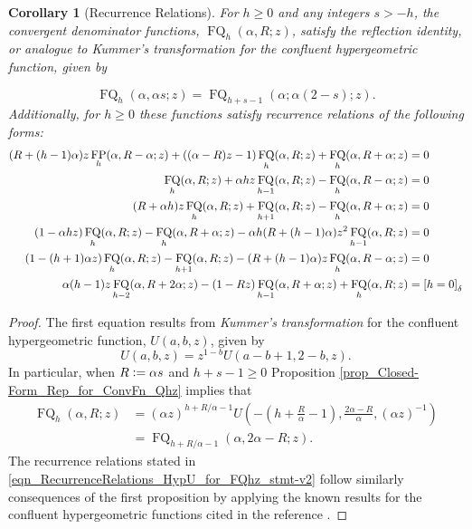 \documentclass[12pt,reqno]{article}
\renewenvironment{subequations}{%
  \refstepcounter{equation}%
  \edef\theparentequation{\theequation}%
  \setcounter{parentequation}{\value{equation}}%
  \setcounter{equation}{0}%
  \def\theequation{\theparentequation.\alph{equation}}%
  \ignorespaces
}{%
  \setcounter{equation}{\value{parentequation}}%
  \ignorespacesafterend
}
\numberwithin{sfootnote}{section}
\numberwithin{equation}{section}
\theoremstyle{DefaultTheoremStyle}
\newtheorem{cor}[theorem]{Corollary}
\theoremstyle{definition}
\newcommand{\defequals}{\ensuremath{\vcentcolon=}}
\newcommand{\StartGroupingSubEquations}{\begin{subequations}}
\newcommand{\EndGroupingSubEquations}{\end{subequations}}
\newcommand{\Iverson}[1]{\ensuremath{\left[#1\right]_{\delta}}}
\newcommand{\HypU}[3]{\ensuremath{U\left(#1, #2, #3\right)}}
\DeclareMathOperator{\FP}{FP}
\DeclareMathOperator{\FQ}{FQ}
\begin{document}
\begin{cor}[Recurrence Relations] 
\label{cor_HypU-Based_recurrences_for_FQhz} 
For $h \geq 0$ and any integers $s > -h$, the convergent denominator functions, 
$\FQ_h(\alpha, R; z)$, satisfy the reflection identity, or 
analogue to \emph{Kummer's transformation} for the 
confluent hypergeometric function, given by 
\StartGroupingSubEquations 
\begin{equation} 
\label{eqn_RecurrenceRelations_HypU_for_FQhz_stmt-v1} 
\FQ_h(\alpha, \alpha s; z) = \FQ_{h+s-1}(\alpha; \alpha (2-s); z). 
\end{equation} 
Additionally, for $h \geq 0$ these functions satisfy 
recurrence relations of the following forms: 
\begin{align} 
\label{eqn_RecurrenceRelations_HypU_for_FQhz_stmt-v2} 
(R+(h-1)\alpha) z \FP_h(\alpha, R-\alpha; z) + ((\alpha-R) z-1) 
     \FQ_h(\alpha, R; z) + \FQ_h(\alpha, R+\alpha; z) & = 0 \\ 
\notag 
\FQ_h(\alpha, R; z) + \alpha h z \FQ_{h-1}(\alpha, R; z) - 
     \FQ_h(\alpha, R-\alpha; z) & = 0 \\ 
\notag 
(R+\alpha h) z \FQ_h(\alpha, R; z) + \FQ_{h+1}(\alpha, R; z) - 
     \FQ_{h}(\alpha, R+\alpha; z) & = 0 \\ 
\notag 
(1-\alpha h z) \FQ_h(\alpha, R; z) - \FQ_h(\alpha, R+\alpha; z) - 
     \alpha h (R + (h - 1) \alpha) z^2 \FQ_{h-1}(\alpha, R; z) & = 0 \\ 
\notag 
(1-(h+1) \alpha z) \FQ_h(\alpha, R; z) - \FQ_{h+1}(\alpha, R; z) - 
     (R + (h-1) \alpha) z \FQ_h(\alpha, R-\alpha; z) & = 0 \\ 
\notag 
\alpha (h-1) z \FQ_{h-2}(\alpha, R+2\alpha; z) - (1-Rz) 
     \FQ_{h-1}(\alpha, R+\alpha; z) + \FQ_h(\alpha, R; z) & = \Iverson{h = 0} 
\end{align} 
\EndGroupingSubEquations 
\end{cor} 
\begin{proof} 
The first equation results from \textit{Kummer's transformation} 
for the confluent hypergeometric function, $\HypU{a}{b}{z}$, 
given by \citep[\S 13.2(vii)]{NISTHB} 
\begin{equation*} 
\HypU{a}{b}{z} = z^{1-b} \HypU{a-b+1}{2-b}{z}. 
\end{equation*} 
In particular, when $R \defequals \alpha s$ and $h+s-1 \geq 0$ 
Proposition \ref{prop_Closed-Form_Rep_for_ConvFn_Qhz} 
implies that 
\begin{align*} 
\FQ_h(\alpha, R; z) & = \left(\alpha z\right)^{h+R/\alpha - 1} 
     \HypU{-(h+\frac{R}{\alpha}-1)}{\frac{2\alpha-R}{\alpha}}{ 
     (\alpha z)^{-1}} \\ 
   & = 
     \FQ_{h+R/\alpha - 1}(\alpha, 2\alpha-R; z). 
\end{align*} 
The recurrence relations stated in 
\eqref{eqn_RecurrenceRelations_HypU_for_FQhz_stmt-v2} follow 
similarly consequences of the first proposition by 
applying the known results for the 
confluent hypergeometric functions cited in the reference 
\citep[\S 13.3(i)]{NISTHB}. 
\end{proof} 
\end{document}
